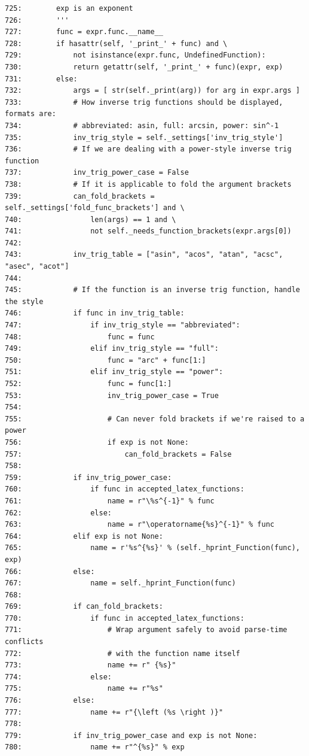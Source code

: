 {\begin{observationbox}
\begin{Verbatim}[breaklines=true, breakanywhere=true]
725:        exp is an exponent
726:        '''
727:        func = expr.func.__name__
728:        if hasattr(self, '_print_' + func) and \
729:            not isinstance(expr.func, UndefinedFunction):
730:            return getattr(self, '_print_' + func)(expr, exp)
731:        else:
732:            args = [ str(self._print(arg)) for arg in expr.args ]
733:            # How inverse trig functions should be displayed, formats are:
734:            # abbreviated: asin, full: arcsin, power: sin^-1
735:            inv_trig_style = self._settings['inv_trig_style']
736:            # If we are dealing with a power-style inverse trig function
737:            inv_trig_power_case = False
738:            # If it is applicable to fold the argument brackets
739:            can_fold_brackets = self._settings['fold_func_brackets'] and \
740:                len(args) == 1 and \
741:                not self._needs_function_brackets(expr.args[0])
742:
743:            inv_trig_table = ["asin", "acos", "atan", "acsc", "asec", "acot"]
744:
745:            # If the function is an inverse trig function, handle the style
746:            if func in inv_trig_table:
747:                if inv_trig_style == "abbreviated":
748:                    func = func
749:                elif inv_trig_style == "full":
750:                    func = "arc" + func[1:]
751:                elif inv_trig_style == "power":
752:                    func = func[1:]
753:                    inv_trig_power_case = True
754:
755:                    # Can never fold brackets if we're raised to a power
756:                    if exp is not None:
757:                        can_fold_brackets = False
758:
759:            if inv_trig_power_case:
760:                if func in accepted_latex_functions:
761:                    name = r"\%s^{-1}" % func
762:                else:
763:                    name = r"\operatorname{%s}^{-1}" % func
764:            elif exp is not None:
765:                name = r'%s^{%s}' % (self._hprint_Function(func), exp)
766:            else:
767:                name = self._hprint_Function(func)
768:
769:            if can_fold_brackets:
770:                if func in accepted_latex_functions:
771:                    # Wrap argument safely to avoid parse-time conflicts
772:                    # with the function name itself
773:                    name += r" {%s}"
774:                else:
775:                    name += r"%s"
776:            else:
777:                name += r"{\left (%s \right )}"
778:
779:            if inv_trig_power_case and exp is not None:
780:                name += r"^{%s}" % exp

\end{Verbatim}
\end{observationbox}}
